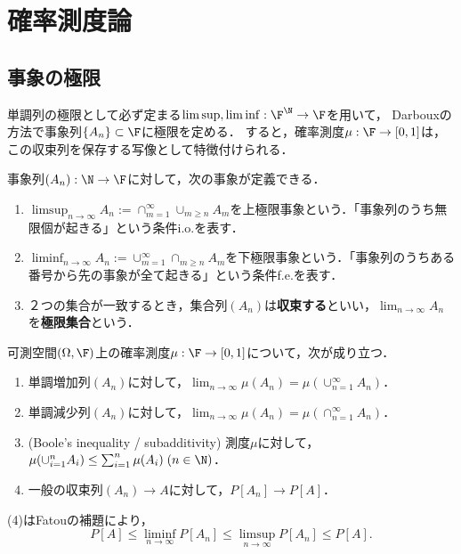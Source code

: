 \documentclass[uplatex,dvipdfmx]{jsreport}
\begin{document}
\section{確率測度論}

\subsection{事象の極限}

\begin{tcolorbox}[colframe=ForestGreen, colback=ForestGreen!10!white,breakable,colbacktitle=ForestGreen!40!white,coltitle=black,fonttitle=\bfseries\sffamily,
title=]
    単調列の極限として必ず定まる$\limsup,\liminf:\F^\N\to\F$を用いて，
    Darbouxの方法で事象列$\{A_n\}\subset\F$に極限を定める．
    すると，確率測度$\mu:\F\to[0,1]$は，この収束列を保存する写像として特徴付けられる．
\end{tcolorbox}

\begin{definition}
    事象列$(A_n):\N\to\F$に対して，次の事象が定義できる．
    \begin{enumerate}
        \item $\limsup_{n\to\infty}A_n:=\cap^\infty_{m=1}\cup_{m\ge n}A_m$を上極限事象という．「事象列のうち無限個が起きる」という条件i.o.を表す．
        \item $\liminf_{n\to\infty}A_n:=\cup^\infty_{m=1}\cap_{m\ge n}A_m$を下極限事象という．「事象列のうちある番号から先の事象が全て起きる」という条件f.e.を表す．
        \item ２つの集合が一致するとき，集合列$(A_n)$は\textbf{収束する}といい，$\lim_{n\to\infty}A_n$を\textbf{極限集合}という．
    \end{enumerate}
\end{definition}

\begin{proposition}[測度の連続性と劣加法性]\label{prop-character-of-measurable-sets}
    可測空間$(\Omega,\F)$上の確率測度$\mu:\F\to[0,1]$について，次が成り立つ．
    \begin{enumerate}
        \item 単調増加列$(A_n)$に対して，$\lim_{n\to\infty}\mu(A_n)=\mu(\cup_{n=1}^\infty A_n)$．
        \item 単調減少列$(A_n)$に対して，$\lim_{n\to\infty}\mu(A_n)=\mu(\cap_{n=1}^\infty A_n)$．
        \item (Boole's inequality / subadditivity) 測度$\mu$に対して，$\mu(\cup^n_{i=1}A_i)\le\sum^n_{i=1}\mu(A_i)\;(n\in\N)$．
        \item 一般の収束列$(A_n)\to A$に対して，$P[A_n]\to P[A]$．
    \end{enumerate}
\end{proposition}
\begin{Proof}
    (4)はFatouの補題により，
    \[P[A]\le\liminf_{n\to\infty}P[A_n]\le\limsup_{n\to\infty}P[A_n]\le P[A].\]
\end{Proof}
\end{document}
